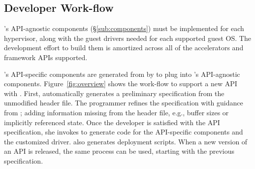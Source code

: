 \begin{comment}
\cjr{I think we've made the point already, and we need the space.}
The router and the specialized transport that enables it distinguishes \model from API remoting and allows \model to support hypervisor level interposition.\amp{might be a strawman. Someone please check and rewrite.}
The router, the \worker, and vendor
device drivers are considered part of the Trusted Computing Base, while the
guest library and the guest \vdev driver are untrusted.

\cjr{Anyone: Add sentence saying exactly how these components are different from traditional API remoting?}
\end{comment}

\subsection{Developer Work-flow}
\label{sub:workflow}

\Model's API-agnostic components (\S\ref{sub:components}) must be implemented for each hypervisor, along with the guest drivers
needed for each supported guest OS. The development effort to build them
is amortized across all of the accelerators and framework APIs supported.

\Model's API-specific components are generated from \speclang by \compiler to
plug into \model's API-agnostic components.
Figure~\ref{fig:overview} shows the work-flow to support a new API with \model.
First, \compiler automatically generates a preliminary \speclang specification from the unmodified header file.
The programmer refines the specification with guidance from \compiler; adding information missing from the header file, e.g., buffer sizes or implicitly referenced state.
Once the developer is satisfied with the API specification, she invokes
\compiler to generate code for the API-specific components and the customized
driver. \Compiler also generates deployment scripts.
When a new version of an API is released, the same process can be used, starting with the previous specification.
